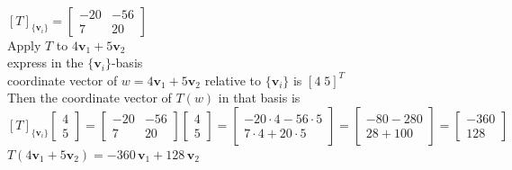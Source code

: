 \documentclass{article}
\begin{document}
{{\begin{enumerate}
\begin{enumerate}[a.]
\\$[T]_{\{\mathbf v_i\}}=\begin{bmatrix}-20 & -56\\[4pt]7 & 20\end{bmatrix}$
\\Apply $T$ to $4\mathbf v_1+5\mathbf v_2$
\\express in the $\{\mathbf v_i\}$-basis
\\coordinate vector of $w=4\mathbf v_1+5\mathbf v_2$ relative to $\{\mathbf v_i\}$ is $[4\; 5]^T$
\\Then the coordinate vector of $T(w)$ in that basis is
\\$[T]_{\{\mathbf v_i\}}\begin{bmatrix}4\\[4pt]5\end{bmatrix}
= \begin{bmatrix}-20 & -56\\[4pt]7 & 20\end{bmatrix}\begin{bmatrix}4\\[4pt]5\end{bmatrix}
= \begin{bmatrix}-20\cdot4-56\cdot5\\[4pt]7\cdot4+20\cdot5\end{bmatrix}
= \begin{bmatrix}-80-280\\[4pt]28+100\end{bmatrix}
= \begin{bmatrix}-360\\[4pt]128\end{bmatrix}$
\\$T(4\mathbf v_1+5\mathbf v_2) = -360\,\mathbf v_1 + 128\,\mathbf v_2$




\end{enumerate}



\end{enumerate}}}
\end{document}
